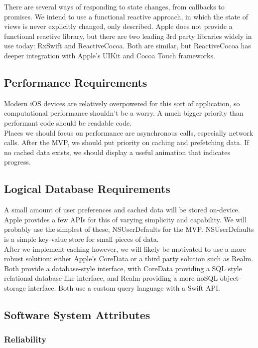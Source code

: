 \documentclass[letterpaper,10pt,titlepage]{article}
\begin{document}
There are several ways of responding to state changes, from callbacks to promises. We intend to use a functional reactive approach, in which the state of views is never explicitly changed, only described. Apple does not provide a functional reactive library, but there are two leading 3rd party libraries widely in use today: RxSwift and ReactiveCocoa. Both are similar, but ReactiveCocoa has deeper integration with Apple's UIKit and Cocoa Touch frameworks.

\subsection{Performance Requirements}

Modern iOS devices are relatively overpowered for this sort of application, so computational performance shouldn't be a worry. A much bigger priority than performant code should be readable code.\\

Places we should focus on performance are asynchronous calls, especially network calls. After the MVP, we should put priority on caching and prefetching data. If no cached data exists, we should display a useful animation that indicates progress.

\subsection{Logical Database Requirements}

A small amount of user preferences and cached data will be stored on-device. Apple provides a few APIs for this of varying simplicity and capability. We will probably use the simplest of these, NSUserDefaults for the MVP. NSUserDefaults is a simple key-value store for small pieces of data.\\

After we implement caching however, we will likely be motivated to use a more robust solution: either Apple's CoreData or a third party solution such as Realm. Both provide a database-style interface, with CoreData providing a SQL style relational database-like interface, and Realm providing a more noSQL object-storage interface. Both use a custom query language with a Swift API.

\subsection{Software System Attributes}

\subsubsection{Reliability}
\end{document}
